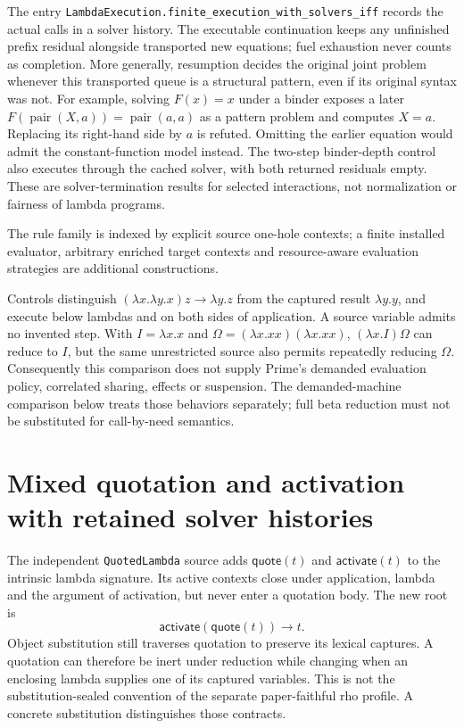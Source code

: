 \documentclass[11pt]{article}
\newcommand{\code}[1]{\texttt{\small #1}}
\begin{document}
The entry \code{LambdaExecution.finite\_execution\_with\_solvers\_iff}
records the actual calls in a solver history. The executable continuation
keeps any unfinished prefix residual alongside transported new equations;
fuel exhaustion never counts as completion. More generally, resumption
decides the original joint problem whenever this transported queue is a
structural pattern, even if its original syntax was not. For example,
solving $F(x)=x$ under a binder exposes a later
$F(\operatorname{pair}(X,a))=\operatorname{pair}(a,a)$ as a pattern problem
and computes $X=a$. Replacing its right-hand side by $a$ is refuted. Omitting
the earlier equation would admit the constant-function model instead.
The two-step binder-depth control also executes through the cached solver,
with both returned residuals empty. These are solver-termination results
for selected interactions, not normalization or fairness of lambda programs.

The rule family is indexed by explicit source one-hole contexts; a finite
installed evaluator, arbitrary enriched target contexts and resource-aware
evaluation strategies are additional constructions.

Controls distinguish $(\lambda x.\lambda y.x)z\longrightarrow\lambda y.z$
from the captured result $\lambda y.y$, and execute below lambdas and on
both sides of application. A source variable admits no invented step.
With $I=\lambda x.x$ and $\Omega=(\lambda x.xx)(\lambda x.xx)$,
$(\lambda x.I)\Omega$ can reduce to $I$, but the same unrestricted source
also permits repeatedly reducing $\Omega$. Consequently this comparison
does not supply Prime's demanded evaluation policy, correlated sharing,
effects or suspension. The demanded-machine comparison below treats those
behaviors separately; full beta reduction must not be substituted for
call-by-need semantics.

\section{Mixed quotation and activation with retained solver histories}

The independent \code{QuotedLambda} source adds
$\mathsf{quote}(t)$ and $\mathsf{activate}(t)$ to the intrinsic lambda
signature. Its active contexts close under application, lambda and the
argument of activation, but never enter a quotation body. The new root is
\[
 \mathsf{activate}(\mathsf{quote}(t))\longrightarrow t.
\]
Object substitution still traverses quotation to preserve its lexical
captures. A quotation can therefore be inert under reduction while changing
when an enclosing lambda supplies one of its captured variables. This is
not the substitution-sealed convention of the separate paper-faithful rho
profile. A concrete substitution distinguishes those contracts.
\end{document}
